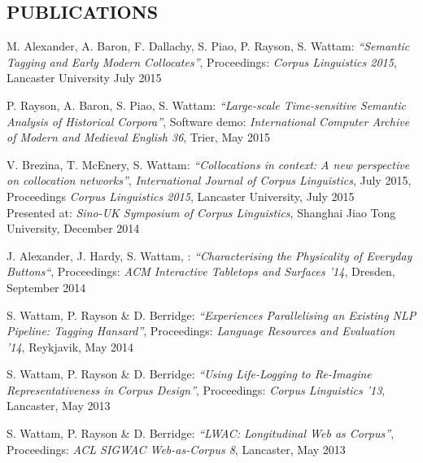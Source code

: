 \documentclass{res}
\begin{document}
\begin{resume}
\section{PUBLICATIONS}
\vspace{0.1in}





M. Alexander, A. Baron, F. Dallachy, S. Piao, P. Rayson, S. Wattam:
\textsl{``Semantic Tagging and Early Modern Collocates''},
Proceedings: {\it Corpus Linguistics 2015},
Lancaster University
July 2015

P. Rayson, A. Baron, S. Piao, S. Wattam:
\textsl{``Large-scale Time-sensitive Semantic Analysis of Historical Corpora''},
Software demo: {\it International Computer Archive of Modern and Medieval English 36},
Trier,
May 2015

V. Brezina, T. McEnery, S. Wattam:
\textsl{``Collocations in context: A new perspective on collocation networks''},
{\it International Journal of Corpus Linguistics},
July 2015,\\
Proceedings {\it Corpus Linguistics 2015},
Lancaster University, 
July 2015\\
Presented at: {\it Sino-UK Symposium of Corpus Linguistics},
Shanghai Jiao Tong University,
December 2014


J. Alexander, J. Hardy, S. Wattam, :
\textsl{``Characterising the Physicality of Everyday Buttons``},
Proceedings: {\it ACM Interactive Tabletops and Surfaces '14},
Dresden,
September 2014


S. Wattam, P. Rayson \& D. Berridge:
\textsl{``Experiences Parallelising an Existing NLP Pipeline: Tagging Hansard''},
Proceedings: {\it Language Resources and Evaluation '14},
Reykjavik,
May 2014


S. Wattam, P. Rayson \& D. Berridge:
\textsl{``Using Life-Logging to Re-Imagine Representativeness in Corpus Design''},
Proceedings: {\it Corpus Linguistics '13},
Lancaster,
May 2013


S. Wattam, P. Rayson \& D. Berridge:
\textsl{``LWAC: Longitudinal Web as Corpus''},
Proceedings: {\it ACL SIGWAC Web-as-Corpus 8},
Lancaster,
May 2013



\end{resume}
\end{document}
